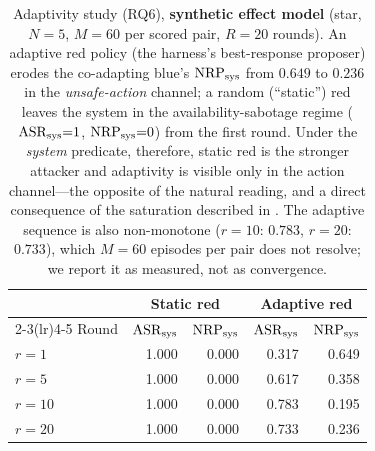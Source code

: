 \begin{table}[t]
\centering
\caption{Adaptivity study (RQ6), \textbf{synthetic effect model} (star, $N{=}5$, $M{=}60$ per
scored pair, $R{=}20$ \corb{} rounds). An adaptive red policy (the harness's best-response
proposer) erodes the co-adapting blue's $\mathrm{NRP}_{\mathrm{sys}}$ from $0.649$ to $0.236$ in the
\emph{unsafe-action} channel; a random (``static'') red leaves the system in the
availability-sabotage regime ($\mathrm{ASR}_{\mathrm{sys}}{=}1$, $\mathrm{NRP}_{\mathrm{sys}}{=}0$) from the first round. Under the
\emph{system} predicate, therefore, static red is the stronger attacker and adaptivity is
visible only in the action channel---the opposite of the natural reading, and a direct
consequence of the saturation described in . The adaptive sequence is also
non-monotone ($r{=}10$: $0.783$, $r{=}20$: $0.733$), which $M{=}60$ episodes per pair does
not resolve; we report it as measured, not as convergence.}
\label{tab:adaptive}
\small
\renewcommand{\arraystretch}{1.08}
\setlength{\tabcolsep}{4pt}
\begin{tabular}{@{}lrrrr@{}}
\toprule
& \multicolumn{2}{c}{Static red} & \multicolumn{2}{c}{Adaptive red} \\
\cmidrule(lr){2-3}\cmidrule(lr){4-5}
Round & $\mathrm{ASR}_{\mathrm{sys}}$ & $\mathrm{NRP}_{\mathrm{sys}}$ & $\mathrm{ASR}_{\mathrm{sys}}$ & $\mathrm{NRP}_{\mathrm{sys}}$ \\
\midrule
$r=1$  & 1.000 & 0.000 & 0.317 & 0.649 \\
$r=5$  & 1.000 & 0.000 & 0.617 & 0.358 \\
$r=10$ & 1.000 & 0.000 & 0.783 & 0.195 \\
$r=20$ & 1.000 & 0.000 & 0.733 & 0.236 \\
\bottomrule
\end{tabular}
\end{table}

